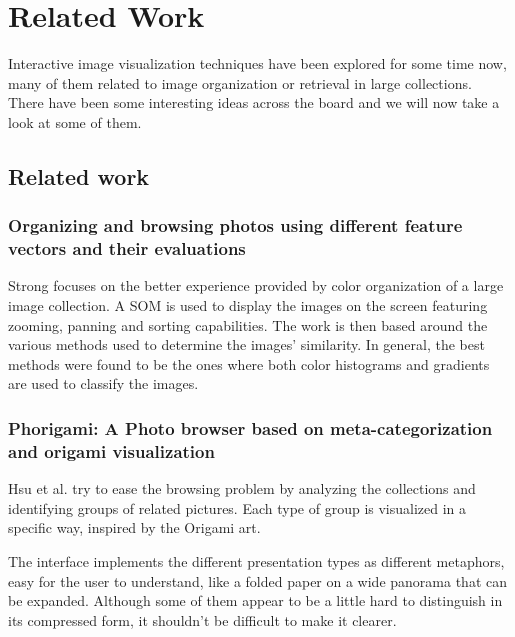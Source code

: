 \section{Related Work}
\label{chapter:related-work}


Interactive image visualization techniques have been explored for some time now, many of them related to image organization or retrieval in large collections. There have been some interesting ideas across the board and we will now take a look at some of them.


\subsection{Related work}


\subsubsection{Organizing and browsing photos using different feature vectors and their evaluations} %
\label{sub:Strong}

Strong \cite{Strong:2009p413} focuses on the better experience provided by color organization of a large image collection.
A \ac{SOM} is used to display the images on the screen featuring zooming, panning and sorting capabilities. The work is then based around the various methods used to determine the images' similarity.
In general, the best methods were found to be the ones where both color histograms and gradients are used to classify the images.





\subsubsection{Phorigami: A Photo browser based on meta-categorization and origami visualization} %
\label{sub:Hsu}

Hsu et al. \cite{Hsu:2009p2696} try to ease the browsing problem by analyzing the collections and identifying groups of related pictures. Each type of group is visualized in a specific way, inspired by the Origami art.

The interface implements the different presentation types as different metaphors, easy for the user to understand, like a folded paper on a wide panorama that can be expanded. Although some of them appear to be a little hard to distinguish in its compressed form, it shouldn't be difficult to make it clearer. 


